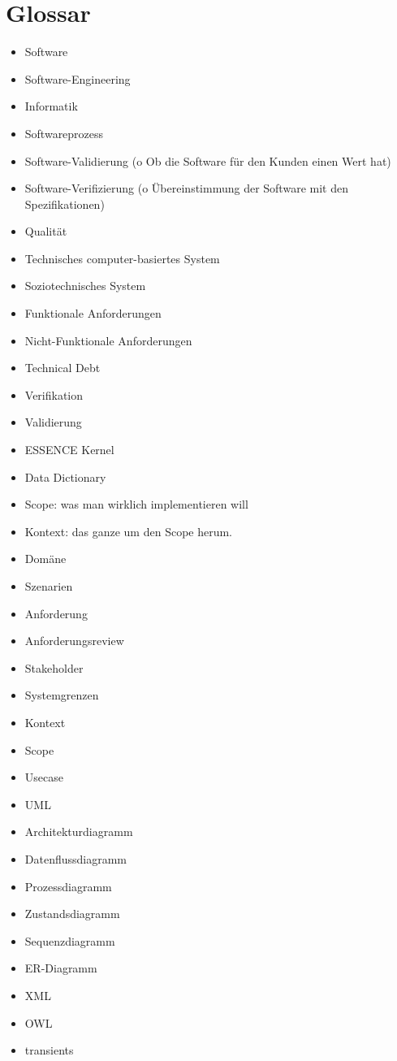 \chapter{Glossar}
\begin{itemize}
\item Software
\item Software-Engineering
\item Informatik
\item Softwareprozess
\item Software-Validierung (o	Ob die Software für den Kunden einen Wert hat)
\item Software-Verifizierung (o	Übereinstimmung der Software mit den Spezifikationen)
\item Qualität
\item Technisches computer-basiertes System
\item Soziotechnisches System
\item Funktionale Anforderungen
\item Nicht-Funktionale Anforderungen
\item Technical Debt
\item Verifikation
\item Validierung
\item ESSENCE Kernel
\item Data Dictionary
\item Scope: was man wirklich implementieren will
\item Kontext: das ganze um den Scope herum.
\item Domäne
\item Szenarien
\item Anforderung
\item Anforderungsreview
\item Stakeholder
\item Systemgrenzen
\item Kontext
\item Scope
\item Usecase
\item UML
\item Architekturdiagramm
\item Datenflussdiagramm
\item Prozessdiagramm
\item Zustandsdiagramm
\item Sequenzdiagramm
\item ER-Diagramm
\item XML
\item OWL
\item transients 

\end{itemize}
